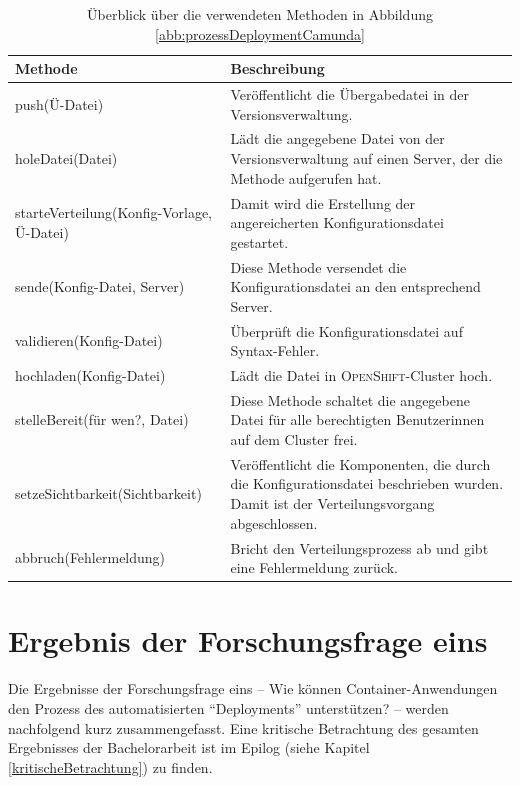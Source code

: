 \begin{table}[h!]
	\centering
	
	\begin{tabular}{@{}p{5.5cm}p{8.0cm}@{}}\toprule[1.5pt]
		
		\textbf{Methode} & \textbf{Beschreibung} \\ \midrule

		
		push(Ü-Datei) & Veröffentlicht die Übergabedatei in der Versionsverwaltung. \\
		holeDatei(Datei) & Lädt die angegebene Datei von der Versionsverwaltung auf einen Server, der die Methode aufgerufen hat. \\
		starteVerteilung(Konfig-Vorlage, Ü-Datei) & Damit wird die Erstellung der angereicherten Konfigurationsdatei gestartet. \\
		sende(Konfig-Datei, Server) & Diese Methode versendet die Konfigurationsdatei an den entsprechend Server. \\
		validieren(Konfig-Datei) & Überprüft die Konfigurationsdatei auf Syntax-Fehler. \\
		hochladen(Konfig-Datei) & Lädt die Datei in \textsc{OpenShift}-Cluster hoch.\\
		stelleBereit(für wen?, Datei) & Diese Methode schaltet die angegebene Datei für alle berechtigten Benutzerinnen auf dem Cluster frei.\\
		setzeSichtbarkeit(Sichtbarkeit) & Veröffentlicht die Komponenten, die durch die Konfigurationsdatei beschrieben wurden. Damit ist der Verteilungsvorgang abgeschlossen.\\
		abbruch(Fehlermeldung) & Bricht den Verteilungsprozess ab und gibt eine Fehlermeldung zurück.\\
		
		\bottomrule[1.5pt]
	\end{tabular}
	
	\caption{Überblick über die verwendeten Methoden in Abbildung \vref{abb:prozessDeploymentCamunda}}
	\label{tab:methodenFunktion}
	
\end{table}
 
\section{Ergebnis der Forschungsfrage eins}
Die Ergebnisse der Forschungsfrage eins -- Wie können Container-Anwendungen den Prozess des automatisierten \enquote{Deployments} unterstützen? -- werden nachfolgend kurz zusammengefasst. Eine kritische Betrachtung des gesamten Ergebnisses der Bachelorarbeit ist im Epilog (siehe Kapitel \vref{kritischeBetrachtung}) zu finden.

